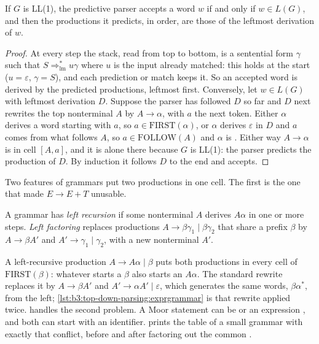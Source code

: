 \begin{theorem}\label{thm:b3:top-down-parsing:ll1}
If $G$ is LL(1), the predictive parser accepts a word $w$ if and only if $w \in L(G)$, and then the productions it predicts, in order, are those of the leftmost derivation of $w$.
\end{theorem}

\begin{proof}
At every step the stack, read from top to bottom, is a sentential form $\gamma$ such that $S \Rightarrow^*_{\mathrm{lm}} u\gamma$ where $u$ is the input already matched: this holds at the start ($u = \varepsilon$, $\gamma = S$), and each prediction or match keeps it. So an accepted word is derived by the predicted productions, leftmost first. Conversely, let $w \in L(G)$ with leftmost derivation $D$. Suppose the parser has followed $D$ so far and $D$ next rewrites the top nonterminal $A$ by $A \to \alpha$, with $a$ the next token. Either $\alpha$ derives a word starting with $a$, so $a \in \mathrm{FIRST}(\alpha)$, or $\alpha$ derives $\varepsilon$ in $D$ and $a$ comes from what follows $A$, so $a \in \mathrm{FOLLOW}(A)$ and $\alpha$ is . Either way $A \to \alpha$ is in cell $[A, a]$, and it is alone there because $G$ is LL(1): the parser predicts the production of $D$. By induction it follows $D$ to the end and accepts.
\end{proof}

Two features of grammars put two productions in one cell. The first is the one that made $E \to E + T$ unusable.

\begin{definition}\label{def:b3:top-down-parsing:left-recursion}
A grammar has \emph{left recursion} if some nonterminal $A$ derives $A\alpha$ in one or more steps. \emph{Left factoring} replaces productions $A \to \beta\gamma_1 \mid \beta\gamma_2$ that share a prefix $\beta$ by $A \to \beta A'$ and $A' \to \gamma_1 \mid \gamma_2$, with a new nonterminal $A'$.
\end{definition}

A left-recursive production $A \to A\alpha \mid \beta$ puts both productions in every cell of $\mathrm{FIRST}(\beta)$: whatever starts a $\beta$ also starts an $A\alpha$. The standard rewrite replaces it by $A \to \beta A'$ and $A' \to \alpha A' \mid \varepsilon$, which generates the same words, $\beta\alpha^*$, from the left; \cref{lst:b3:top-down-parsing:exprgrammar} is that rewrite applied twice.  handles the second problem. A Moor statement can be  or an expression , and both can start with an identifier.  prints the table of a small grammar with exactly that conflict, before and after factoring out the common .

